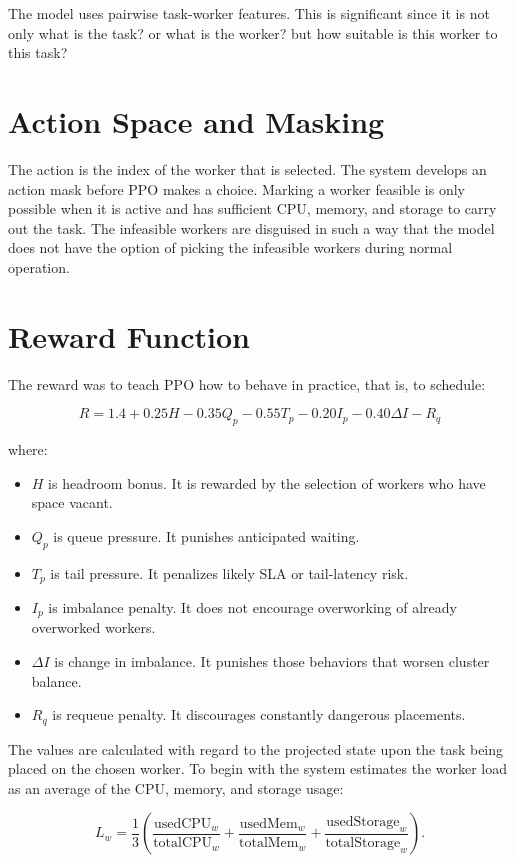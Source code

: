 The model uses pairwise task-worker features. This is significant since it is not only what is the task? or what is the worker? but how suitable is this worker to this task?

\section{Action Space and Masking}

The action is the index of the worker that is selected. The system develops an action mask before PPO makes a choice. Marking a worker feasible is only possible when it is active and has sufficient CPU, memory, and storage to carry out the task. The infeasible workers are disguised in such a way that the model does not have the option of picking the infeasible workers during normal operation.

\section{Reward Function}

The reward was to teach PPO how to behave in practice, that is, to schedule:

\[
R = 1.4 + 0.25H - 0.35Q_p - 0.55T_p - 0.20I_p - 0.40\Delta I - R_q
\]

where:

\begin{itemize}
    \item \(H\) is headroom bonus. It is rewarded by the selection of workers who have space vacant.
    \item \(Q_p\) is queue pressure. It punishes anticipated waiting.
    \item \(T_p\) is tail pressure. It penalizes likely SLA or tail-latency risk.
    \item \(I_p\) is imbalance penalty. It does not encourage overworking of already overworked workers.
    \item \(\Delta I\) is change in imbalance. It punishes those behaviors that worsen cluster balance.
    \item \(R_q\) is requeue penalty. It discourages constantly dangerous placements.
\end{itemize}

The values are calculated with regard to the projected state upon the task being placed on the chosen worker. To begin with the system estimates the worker load as an average of the CPU, memory, and storage usage:

\[
L_w = \frac{1}{3}\left(\frac{\text{usedCPU}_w}{\text{totalCPU}_w} + \frac{\text{usedMem}_w}{\text{totalMem}_w} + \frac{\text{usedStorage}_w}{\text{totalStorage}_w}\right).
\]

